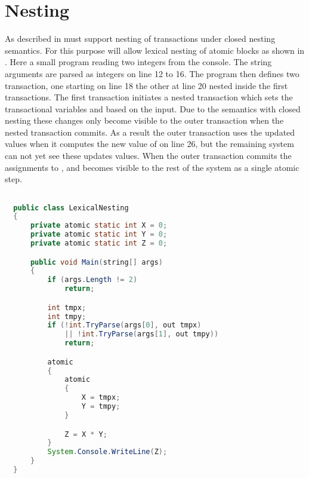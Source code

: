 \section{Nesting}\label{sec:nesting_design}
As described in  \stmnamesp must support nesting of transactions under closed nesting semantics. For this purpose \stmnamesp will allow lexical nesting of atomic blocks as shown in . Here a small program reading two integers from the console. The string arguments are parsed as integers on line 12 to 16. The program then defines two transaction, one starting on line 18 the other at line 20 nested inside the first transactions. The first transaction initiates a nested transaction which sets the transactional variables  and  based on the input. Due to the semantics with closed nesting these changes only become visible to the outer transaction when the nested transaction commits. As a result the outer transaction uses the updated values when it computes the new value of  on line 26, but the remaining system can not yet see these updates values. When the outer transaction commits the assignments to ,  and  becomes visible to the rest of the system as a single atomic step.

\begin{lstlisting}[label=lst:stm_syntax_lexical_nesting,
  caption={Lexical Nesting},
  language=Java,  
  showspaces=false,
  showtabs=false,
  breaklines=true,
  showstringspaces=false,
  breakatwhitespace=true,
  commentstyle=\color{greencomments},
  keywordstyle=\color{bluekeywords},
  stringstyle=\color{redstrings},
  morekeywords={atomic, retry, orelse, var, get, set, using}]  % Start your code-block

  public class LexicalNesting
  {
      private atomic static int X = 0;
      private atomic static int Y = 0;
      private atomic static int Z = 0;

      public void Main(string[] args)
      {
          if (args.Length != 2)
              return;

          int tmpx;
          int tmpy;
          if (!int.TryParse(args[0], out tmpx) 
              || !int.TryParse(args[1], out tmpy))
              return;

          atomic
          {
              atomic
              {
                  X = tmpx;
                  Y = tmpy;
              }

              Z = X * Y;
          }
          System.Console.WriteLine(Z);
      }
  }
\end{lstlisting}

